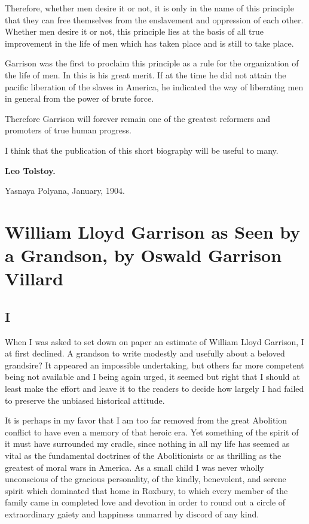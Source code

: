 \documentclass{book}
\begin{document}
Therefore, whether men desire it or not, it is only in the name of this principle that they can free themselves from the enslavement and oppression of each other. Whether men desire it or not, this principle lies at the basis of all true improvement in the life of men which has taken place and is still to take place.

Garrison was the first to proclaim this principle as a rule for the organization of the life of men. In this is his great merit. If at the time he did not attain the pacific liberation of the slaves in America, he indicated the way of liberating men in general from the power of brute force.

Therefore Garrison will forever remain one of the greatest reformers and promoters of true human progress.

I think that the publication of this short biography will be useful to many.

\textbf{Leo Tolstoy.}

Yasnaya Polyana, January, 1904.

\chapter{William Lloyd Garrison as Seen by a Grandson, by Oswald Garrison Villard}
\label{chapter-5}
\section{I}
When I was asked to set down on paper an estimate of William Lloyd Garrison, I at first declined. A grandson to write modestly and usefully about a beloved grandsire? It appeared an impossible undertaking, but others far more competent being not available and I being again urged, it seemed but right that I should at least make the effort and leave it to the readers to decide how largely I had failed to preserve the unbiased historical attitude.

It is perhaps in my favor that I am too far removed from the great Abolition conflict to have even a memory of that heroic era. Yet something of the spirit of it must have surrounded my cradle, since nothing in all my life has seemed as vital as the fundamental doctrines of the Abolitionists or as thrilling as the greatest of moral wars in America. As a small child I was never wholly unconscious of the gracious personality, of the kindly, benevolent, and serene spirit which dominated that home in Roxbury, to which every member of the family came in completed love and devotion in order to round out a circle of extraordinary gaiety and happiness unmarred by discord of any kind.
\end{document}

